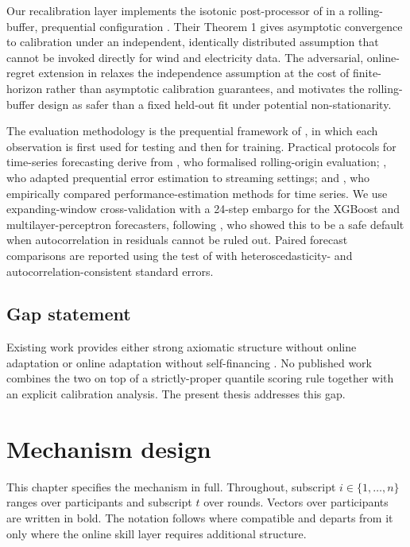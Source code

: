 \documentclass[
  11pt,
  a4paper,
  oneside]{report}
\begin{document}
Our recalibration layer implements the isotonic post-processor of
\citet{kuleshov2018accurate} in a rolling-buffer, prequential
configuration \citep{dawid1984prequential}. Their Theorem 1 gives
asymptotic convergence to calibration under an independent, identically
distributed assumption that cannot be invoked directly for wind and
electricity data. The adversarial, online-regret extension in
\citet{deshpande2023calibrated} relaxes the independence assumption at
the cost of finite-horizon rather than asymptotic calibration
guarantees, and motivates the rolling-buffer design as safer than a
fixed held-out fit under potential non-stationarity.

The evaluation methodology is the prequential framework of
\citet{dawid1984prequential}, in which each observation is first used
for testing and then for training. Practical protocols for time-series
forecasting derive from \citet{tashman2000outofsample}, who formalised
rolling-origin evaluation; \citet{gama2013stream}, who adapted
prequential error estimation to streaming settings; and
\citet{cerqueira2020evaluating}, who empirically compared
performance-estimation methods for time series. We use expanding-window
cross-validation with a 24-step embargo for the XGBoost and
multilayer-perceptron forecasters, following \citet{bergmeir2018note},
who showed this to be a safe default when autocorrelation in residuals
cannot be ruled out. Paired forecast comparisons are reported using the
test of \citet{diebold1995comparing} with heteroscedasticity- and
autocorrelation-consistent standard errors.

\section{Gap statement}\label{gap-statement}

Existing work provides either strong axiomatic structure without online
adaptation \citep{lambert2008selffinanced, raja2024wagering} or online
adaptation without self-financing \citep{vitali2025intermittent}. No
published work combines the two on top of a strictly-proper quantile
scoring rule together with an explicit calibration analysis. The present
thesis addresses this gap.

\chapter{Mechanism design}\label{ch:mechanism}

This chapter specifies the mechanism in full. Throughout, subscript
\(i \in \{1, \dots, n\}\) ranges over participants and subscript \(t\)
over rounds. Vectors over participants are written in bold. The notation
follows \citet{lambert2008selffinanced} where compatible and departs
from it only where the online skill layer requires additional structure.
\end{document}
